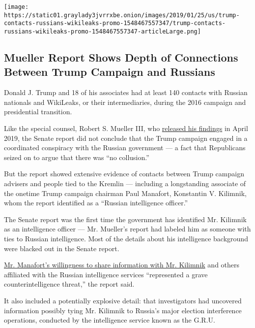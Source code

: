 \href{https://www.nytimes3xbfgragh.onion/interactive/2019/01/26/us/politics/trump-contacts-russians-wikileaks.html}{}

\texttt{[image: https://static01.graylady3jvrrxbe.onion/images/2019/01/25/us/trump-contacts-russians-wikileaks-promo-1548467557347/trump-contacts-russians-wikileaks-promo-1548467557347-articleLarge.png]}

\hypertarget{mueller-report-shows-depth-of-connections-between-trump-campaign-and-russians}{%
\subsection{Mueller Report Shows Depth of Connections Between Trump
Campaign and
Russians}\label{mueller-report-shows-depth-of-connections-between-trump-campaign-and-russians}}

Donald J. Trump and 18 of his associates had at least 140 contacts with
Russian nationals and WikiLeaks, or their intermediaries, during the
2016 campaign and presidential transition.

Like the special counsel, Robert S. Mueller III, who
\href{https://www.nytimes3xbfgragh.onion/2019/04/18/us/politics/mueller-report-russian-interference-donald-trump.html}{released
his findings} in April 2019, the Senate report did not conclude that the
Trump campaign engaged in a coordinated conspiracy with the Russian
government --- a fact that Republicans seized on to argue that there was
``no collusion.''

But the report showed extensive evidence of contacts between Trump
campaign advisers and people tied to the Kremlin --- including a
longstanding associate of the onetime Trump campaign chairman Paul
Manafort, Konstantin V. Kilimnik, whom the report identified as a
``Russian intelligence officer.''

The Senate report was the first time the government has identified Mr.
Kilimnik as an intelligence officer --- Mr. Mueller's report had labeled
him as someone with ties to Russian intelligence. Most of the details
about his intelligence background were blacked out in the Senate report.

\href{https://www.nytimes3xbfgragh.onion/2020/08/18/us/politics/paul-manafort-konstantin-kilimnik.html}{Mr.
Manafort's willingness to share information with Mr. Kilimnik} and
others affiliated with the Russian intelligence services ``represented a
grave counterintelligence threat,'' the report said.

It also included a potentially explosive detail: that investigators had
uncovered information possibly tying Mr. Kilimnik to Russia's major
election interference operations, conducted by the intelligence service
known as the G.R.U.

